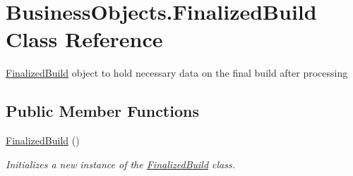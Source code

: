\hypertarget{class_business_objects_1_1_finalized_build}{}\section{Business\+Objects.\+Finalized\+Build Class Reference}
\label{class_business_objects_1_1_finalized_build}


\hyperlink{class_business_objects_1_1_finalized_build}{Finalized\+Build} object to hold necessary data on the final build after processing  


\subsection*{Public Member Functions}
\begin{DoxyCompactItemize}
\item 
\hyperlink{class_business_objects_1_1_finalized_build_a5e7af45a663b29b74366c76d4f9acdbc}{Finalized\+Build} ()
\begin{DoxyCompactList}\small\item\em Initializes a new instance of the \hyperlink{class_business_objects_1_1_finalized_build}{Finalized\+Build} class. \end{DoxyCompactList}\end{DoxyCompactItemize}
